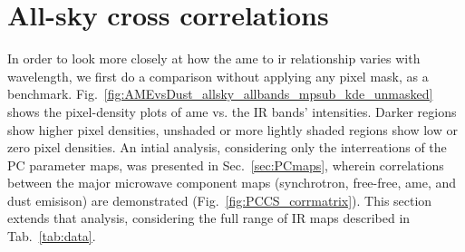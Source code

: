   \section{All-sky cross correlations}
        In order to look more closely at how the \acrshort{ame} to \acrshort{ir} relationship varies with wavelength, we first do a comparison without applying any pixel mask, as a benchmark. Fig.~\ref{fig:AMEvsDust_allsky_allbands_mpsub_kde_unmasked} shows the pixel-density plots of \acrshort{ame} vs. the IR bands' intensities. Darker regions show higher pixel densities, unshaded or more lightly shaded regions show low or zero pixel densities. An intial analysis, considering only the interreations of the PC parameter maps, was presented in Sec.~\ref{sec:PCmaps}, wherein correlations between the major microwave component maps (synchrotron, free-free, \acrshort{ame}, and dust emisison) are demonstrated (Fig.~\ref{fig:PCCS_corrmatrix}). This section extends that analysis, considering the full range of IR maps described in Tab.~\ref{tab:data}.

